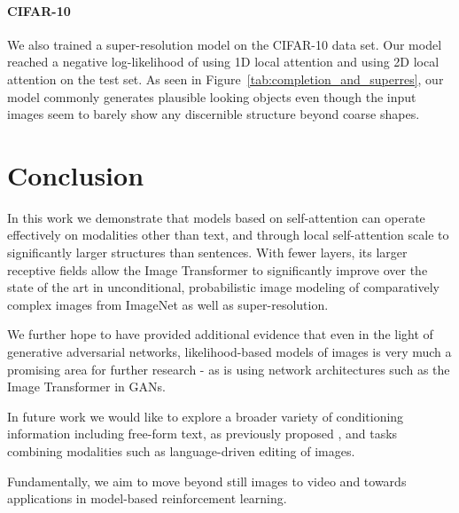 \documentclass{article}
\begin{document}
\paragraph{CIFAR-10} We also trained a super-resolution model on the CIFAR-10 data set. Our model reached a negative log-likelihood of  using 1D local attention and  using 2D local attention on the test set. As seen in Figure~\ref{tab:completion_and_superres}, our model commonly generates plausible looking objects even though the input images seem to barely show any discernible structure beyond coarse shapes. 


\section{Conclusion}

In this work we demonstrate that models based on self-attention can operate effectively on modalities other than text, and through local self-attention scale to significantly larger structures than sentences. With fewer layers, its larger receptive fields allow the Image Transformer to significantly improve over the state of the art in unconditional, probabilistic image modeling of comparatively complex images from ImageNet as well as super-resolution.

We further hope to have provided additional evidence that even in the light of generative adversarial networks, likelihood-based models of images is very much a promising area for further research - as is using network architectures such as the Image Transformer in GANs.

In future work we would like to explore a broader variety of conditioning information including free-form text, as previously proposed \citep{Mansimov15}, and tasks combining modalities such as language-driven editing of images.

Fundamentally, we aim to move beyond still images to video \citep{Kalchbrenner16} and towards applications in model-based reinforcement learning.












\end{document}
